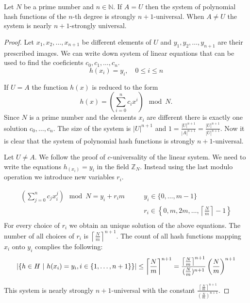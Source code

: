 \begin{remark}
Let $N$ be a prime number and $n \in \mathbb{N}$. If $A = U$ then the system of polynomial hash functions of the $n$-th degree is strongly $n + 1$-universal. When $A \neq U$ the system is nearly $n + 1$-strongly universal.
\end{remark}
\begin{proof}
Let $x_1, x_2, \dots, x_{n+1}$ be different elements of $U$ and $y_1, y_2, \dots, y_{n+1}$ are their prescribed images. We can write down system of linear equations that can be used to find the coeficients $c_0, c_1, \dots, c_n$.
\[ 
h(x_i) = y_i, \quad 0 \leq i \leq n 
\]

If $U = A$ the function $h(x)$ is reduced to the form \[ h(x) = \left( \displaystyle \sum_{i=0}^{n} c_i x^i \right) \mod N \textit{.} \] Since $N$ is a prime number and the elements $x_i$ are different there is exactly one solution $c_0, \dots, c_n$. The size of the system is ${|U|}^{n+1}$ and $1 = \frac{|U| ^ {n + 1}}{|A|^{n + 1}} = \frac{|U| ^ {n + 1}}{|U|^{n + 1}}$. Now it is clear that the system of polynomial hash functions is strongly $n + 1$-universal.

Let $U \neq A$. We follow the proof of $c$-universality of the linear system. We need to write the equations $h_(x_i) = y_i$ in the field $\mathbb{Z}_N$. Instead using the last modulo operation we introduce new variables $r_i$.

\begin{displaymath}
\begin{split}
\left(\displaystyle \sum_{j=0}^{n} c_j x_{i}^{j} \right) \mod N = {y}_i + {r_i}{m} \qquad 
 & y_i \in \{0, \dots, m - 1 \} \\
 & r_i \in \left\{0, m, 2m, \dots, \left\lceil \frac{N}{m} \right\rceil - 1 \right\} \\
\end{split}
\end{displaymath}
For every choice of $r_i$ we obtain an unique solution of the above equations. The number of all choices of $r_i$ is ${\left\lceil \frac{N}{m} \right\rceil}^{n + 1}$. The count of all hash functions mapping $x_i$ onto $y_i$ complies the following:
\begin{displaymath}
|\{h \in H \ | \  h(x_i) = y_i, i \in \{1, \dots, n + 1\}\}| \leq {\left\lceil \frac{N}{m} \right\rceil}^{n + 1} = \frac{{\left\lceil \frac{N}{m} \right\rceil}^{n + 1}}{(\frac{N}{m})^{n+1}}\left(\frac{N}{m}\right)^{n+1}
\end{displaymath}

This system is nearly strongly $n+1$-universal with the constant $\frac{{\left\lceil \frac{N}{m} \right\rceil}^{n + 1}}{(\frac{N}{m})^{n+1}}$.
\end{proof}

